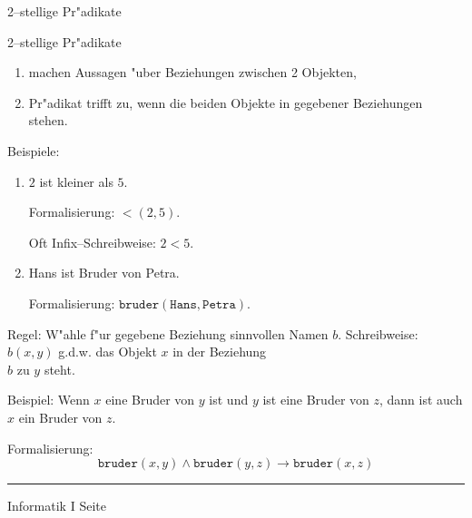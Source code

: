 \begin{slide}{}
\normalsize
\begin{center}
2--stellige Pr"adikate
\end{center}
\vspace{0.5cm}

\footnotesize
2--stellige Pr"adikate
\begin{enumerate}
\item machen Aussagen "uber Beziehungen zwischen 2 Objekten,
\item Pr"adikat trifft zu, wenn die beiden Objekte in gegebener Beziehungen stehen.
\end{enumerate}

Beispiele:
\begin{enumerate}
\item $2$ ist kleiner als $5$.

      Formalisierung: $<(2,5)$. 
      
      Oft Infix--Schreibweise:  $2 < 5$.
\item Hans ist Bruder von Petra.

      Formalisierung: $\mathtt{bruder}(\mathtt{Hans}, \mathtt{Petra})$.
\end{enumerate}
Regel: W"ahle f"ur gegebene Beziehung sinnvollen Namen $b$.
Schreibweise: \\[0.3cm]
\hspace*{1.3cm} 
$b(x,y)$ g.d.w. das Objekt $x$ in der Beziehung \\[0.1cm]
\hspace*{1.3cm} $b$ zu $y$ steht.

Beispiel: Wenn $x$ eine Bruder von $y$ ist und $y$ ist eine Bruder von $z$, dann ist auch
$x$ ein Bruder von $z$.

Formalisierung:
$$ \mathtt{bruder}(x, y) \wedge \mathtt{bruder}(y, z) \rightarrow \mathtt{bruder}(x,z) $$

\vspace*{\fill}
\tiny \addtocounter{mypage}{1}
\rule{15cm}{1mm}
Informatik I  \hspace*{\fill} Seite 
\end{slide}


